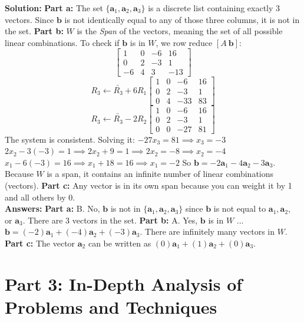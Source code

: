 \documentclass[11pt]{article}
\begin{document}
\textbf{Solution:}
\textbf{Part a:} The set $\{\mathbf{a}_1, \mathbf{a}_2, \mathbf{a}_3\}$ is a discrete list containing exactly 3 vectors. Since $\mathbf{b}$ is not identically equal to any of those three columns, it is not in the set.
\textbf{Part b:} $W$ is the \textit{Span} of the vectors, meaning the set of all possible linear combinations. To check if $\mathbf{b}$ is in $W$, we row reduce $[A \ \mathbf{b}]$:
\[ \begin{bmatrix} 1 & 0 & -6 & 16 \\ 0 & 2 & -3 & 1 \\ -6 & 4 & 3 & -13 \end{bmatrix} \]
\[ \underrightarrow{R_3 \leftarrow R_3 + 6R_1} \begin{bmatrix} 1 & 0 & -6 & 16 \\ 0 & 2 & -3 & 1 \\ 0 & 4 & -33 & 83 \end{bmatrix} \]
\[ \underrightarrow{R_3 \leftarrow R_3 - 2R_2} \begin{bmatrix} 1 & 0 & -6 & 16 \\ 0 & 2 & -3 & 1 \\ 0 & 0 & -27 & 81 \end{bmatrix} \]
The system is consistent. Solving it:
$-27x_3 = 81 \implies x_3 = -3$
$2x_2 - 3(-3) = 1 \implies 2x_2 + 9 = 1 \implies 2x_2 = -8 \implies x_2 = -4$
$x_1 - 6(-3) = 16 \implies x_1 + 18 = 16 \implies x_1 = -2$
So $\mathbf{b} = -2\mathbf{a}_1 - 4\mathbf{a}_2 - 3\mathbf{a}_3$. Because $W$ is a span, it contains an infinite number of linear combinations (vectors).
\textbf{Part c:} Any vector is in its own span because you can weight it by 1 and all others by 0.
\\
\textbf{Answers:}
\textbf{Part a:} B. No, $\mathbf{b}$ is not in $\{\mathbf{a}_1, \mathbf{a}_2, \mathbf{a}_3\}$ since $\mathbf{b}$ is not equal to $\mathbf{a}_1, \mathbf{a}_2,$ or $\mathbf{a}_3$. There are 3 vectors in the set.
\textbf{Part b:} A. Yes, $\mathbf{b}$ is in $W$ ... $\mathbf{b} = (-2)\mathbf{a}_1 + (-4)\mathbf{a}_2 + (-3)\mathbf{a}_3$. There are infinitely many vectors in $W$.
\textbf{Part c:} The vector $\mathbf{a}_2$ can be written as $(0)\mathbf{a}_1 + (1)\mathbf{a}_2 + (0)\mathbf{a}_3$.

\newpage
\section{Part 3: In-Depth Analysis of Problems and Techniques}
\end{document}

